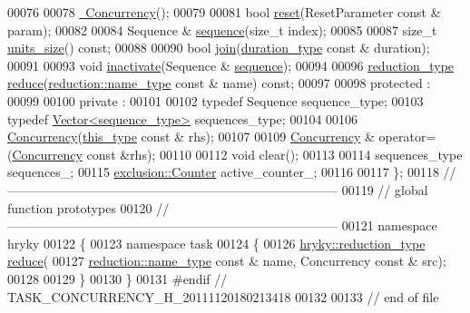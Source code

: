 \begin{DoxyCode}
00076 
00078     \hyperlink{classhryky_1_1task_1_1_concurrency_af31a03465d7ffd79dbd47aea5cc0f1f6}{~Concurrency}();
00079 
00081     \textcolor{keywordtype}{bool} \hyperlink{classhryky_1_1task_1_1_concurrency_aa81eeaa909ee4abde16a1619da5c011d}{reset}(ResetParameter \textcolor{keyword}{const} & param);
00082 
00084     Sequence & \hyperlink{classhryky_1_1task_1_1_concurrency_aa82281dbb7df8aa9fcad2acb9ecb4531}{sequence}(\textcolor{keywordtype}{size\_t} index);
00085 
00087     \textcolor{keywordtype}{size\_t} \hyperlink{classhryky_1_1task_1_1_concurrency_a2def26af9d687f558bbdb77f8c59f142}{units_size}() \textcolor{keyword}{const};
00088 
00090     \textcolor{keywordtype}{bool} \hyperlink{classhryky_1_1task_1_1_concurrency_a8a1fc39c3672f169bd8036f4cd64d760}{join}(\hyperlink{namespacehryky_1_1task_ab22f4f47e2ef029ecd5373ffbaba40cf}{duration_type} \textcolor{keyword}{const} & duration);
00091 
00093     \textcolor{keywordtype}{void} \hyperlink{classhryky_1_1task_1_1_concurrency_a8a4b9007de2f05ea345d9ea428294db9}{inactivate}(Sequence & \hyperlink{classhryky_1_1task_1_1_concurrency_aa82281dbb7df8aa9fcad2acb9ecb4531}{sequence});
00094 
00096     \hyperlink{classhryky_1_1_intrusive_ptr}{reduction_type} \hyperlink{classhryky_1_1task_1_1_concurrency_aae1a21906a197f2962b355e7e2bcf702}{reduce}(\hyperlink{classhryky_1_1reduction_1_1_string}{reduction::name_type} \textcolor{keyword}{const} & name) \textcolor{keyword}{const};
00097 
00098 \textcolor{keyword}{protected} :
00099 
00100 \textcolor{keyword}{private} :
00101 
00102     \textcolor{keyword}{typedef} Sequence                sequence\_type;
00103     \textcolor{keyword}{typedef} \hyperlink{classhryky_1_1_vector}{Vector<sequence_type>}   sequences\_type;
00104 
00106     \hyperlink{classhryky_1_1task_1_1_concurrency_a53b1408cb51dd3a1894653fd83c5824e}{Concurrency}(\hyperlink{classhryky_1_1task_1_1_concurrency_a308791b2b4bbce8f93f8b36b4680ca14}{this_type} \textcolor{keyword}{const} & rhs);
00107 
00109     \hyperlink{classhryky_1_1task_1_1_concurrency}{Concurrency} & operator=(\hyperlink{classhryky_1_1task_1_1_concurrency}{Concurrency} \textcolor{keyword}{const} &rhs);
00110 
00112     \textcolor{keywordtype}{void} clear();
00113 
00114     sequences\_type          sequences\_;
00115     \hyperlink{classhryky_1_1exclusion_1_1_counter}{exclusion::Counter}      active\_counter\_;
00116 
00117 \};
00118 \textcolor{comment}{//
      ------------------------------------------------------------------------------}
00119 \textcolor{comment}{// global function prototypes}
00120 \textcolor{comment}{//
      ------------------------------------------------------------------------------}
00121 \textcolor{keyword}{namespace }hryky
00122 \{
00123 \textcolor{keyword}{namespace }task
00124 \{
00126     \hyperlink{classhryky_1_1_intrusive_ptr}{hryky::reduction_type} \hyperlink{namespacehryky_1_1task_a3cd1766998ce63e0a3886c8a3abd02ca}{reduce}(
00127         \hyperlink{classhryky_1_1reduction_1_1_string}{reduction::name_type} \textcolor{keyword}{const} & name, Concurrency \textcolor{keyword}{const} & src);
00128 
00129 \}
00130 \}
00131 \textcolor{preprocessor}{#endif // TASK\_CONCURRENCY\_H\_20111120180213418}
00132 \textcolor{preprocessor}{}
00133 \textcolor{comment}{// end of file}
\end{DoxyCode}
